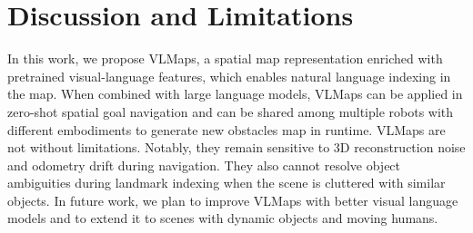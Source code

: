\documentclass[letterpaper, 10 pt, conference]{ieeeconf}  %
\begin{document}
\section{Discussion and Limitations}
In this work, we propose VLMaps, a spatial map representation enriched with pretrained visual-language features, which enables natural language indexing in the map. When combined with large language models, VLMaps can be applied in zero-shot spatial goal navigation and can be shared among multiple robots with different embodiments to generate new obstacles map in runtime. VLMaps are not without limitations. Notably, they remain sensitive to 3D reconstruction noise and odometry drift during navigation. They also cannot resolve object ambiguities during landmark indexing when the scene is cluttered with similar objects. In future work, we plan to improve VLMaps with better visual language models and to extend it to scenes with dynamic objects and moving humans.













\end{document}
